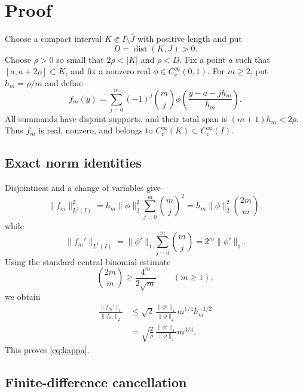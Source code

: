\documentclass[11pt]{article}
\begin{document}
\section{Proof}

Choose a compact interval $K\Subset I\setminus\overline J$ with positive
length and put
\[
 D=\operatorname{dist}(K,J)>0.
\]
Choose $\rho>0$ so small that $2\rho<|K|$ and $\rho<D$.  Fix a point $a$
such that $[a,a+2\rho]\subset K$, and fix a nonzero real
$\phi\in C_c^\infty(0,1)$.  For $m\ge2$, put $h_m=\rho/m$ and define
\begin{equation}\label{eq:fm}
 f_m(y)=\sum_{j=0}^m(-1)^j\binom mj
 \phi\!\left(\frac{y-a-jh_m}{h_m}\right).
\end{equation}
All summands have disjoint supports, and their total span is
$(m+1)h_m<2\rho$.  Thus $f_m$ is real, nonzero, and belongs to
$C_c^\infty(K)\subset C_c^\infty(I)$.

\subsection*{Exact norm identities}

Disjointness and a change of variables give
\begin{equation}\label{eq:l2}
 \|f_m\|_{L^2(I)}^2
 =h_m\|\phi\|_2^2\sum_{j=0}^m\binom mj^2
 =h_m\|\phi\|_2^2\binom{2m}m,
\end{equation}
while
\begin{equation}\label{eq:l1}
 \|f_m'\|_{L^1(I)}
 =\|\phi'\|_1\sum_{j=0}^m\binom mj
 =2^m\|\phi'\|_1.
\end{equation}
Using the standard central-binomial estimate
\begin{equation}\label{eq:central}
 \binom{2m}m\ge\frac{4^m}{2\sqrt m}\qquad(m\ge1),
\end{equation}
we obtain
\begin{align*}
 \frac{\|f_m'\|_1}{\|f_m\|_2}
 &\le \sqrt2\,\frac{\|\phi'\|_1}{\|\phi\|_2}
       m^{1/4}h_m^{-1/2}\\
 &=\sqrt{\frac2\rho}\,\frac{\|\phi'\|_1}{\|\phi\|_2}
       m^{3/4}.
\end{align*}
This proves \eqref{eq:kappa}.

\subsection*{Finite-difference cancellation}
\end{document}
